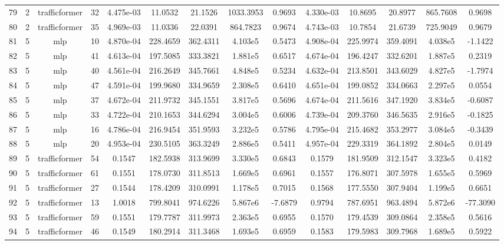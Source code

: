 \begin{landscape}
\begin{longtable}{c | c | c | c | c | c | c | c | c | c | c | c | c | c}
	79 & 2 & trafficformer & 32 & 4.475e-03 & 11.0532 & 21.1526 & 1033.3953 & 0.9693 & 4.330e-03 & 10.8695 & 20.8977 & 865.7608 & 0.9698 \\
	80 & 2 & trafficformer & 35 & 4.969e-03 & 11.0336 & 22.0391 & 864.7823 & 0.9674 & 4.743e-03 & 10.7854 & 21.6739 & 725.9049 & 0.9679 \\
	81 & 5 & mlp & 10 & 4.870e-04 & 228.4659 & 362.4311 & 4.103e5 & 0.5473 & 4.908e-04 & 225.9974 & 359.4091 & 4.038e5 & -1.1422 \\
	82 & 5 & mlp & 41 & 4.613e-04 & 197.5085 & 333.3821 & 1.881e5 & 0.6517 & 4.674e-04 & 196.4247 & 332.6201 & 1.887e5 & 0.2319 \\
	83 & 5 & mlp & 40 & 4.561e-04 & 216.2649 & 345.7661 & 4.848e5 & 0.5234 & 4.632e-04 & 213.8501 & 343.6029 & 4.827e5 & -1.7974 \\
	84 & 5 & mlp & 47 & 4.591e-04 & 199.9680 & 334.9659 & 2.308e5 & 0.6410 & 4.651e-04 & 199.0852 & 334.0663 & 2.297e5 & 0.0554 \\
	85 & 5 & mlp & 37 & 4.672e-04 & 211.9732 & 345.1551 & 3.817e5 & 0.5696 & 4.674e-04 & 211.5616 & 347.1920 & 3.834e5 & -0.6087 \\
	86 & 5 & mlp & 33 & 4.722e-04 & 210.1653 & 344.6294 & 3.004e5 & 0.6006 & 4.739e-04 & 209.3760 & 346.5635 & 2.916e5 & -0.1825 \\
	87 & 5 & mlp & 16 & 4.786e-04 & 216.9454 & 351.9593 & 3.232e5 & 0.5786 & 4.795e-04 & 215.4682 & 353.2977 & 3.084e5 & -0.3439 \\
	88 & 5 & mlp & 20 & 4.953e-04 & 230.5105 & 363.3249 & 2.886e5 & 0.5411 & 4.957e-04 & 229.3319 & 364.1892 & 2.804e5 & 0.0149 \\
	89 & 5 & trafficformer & 54 & 0.1547 & 182.5938 & 313.9699 & 3.330e5 & 0.6843 & 0.1579 & 181.9509 & 312.1547 & 3.323e5 & 0.4182 \\
	90 & 5 & trafficformer & 61 & 0.1551 & 178.0730 & 311.8513 & 1.669e5 & 0.6961 & 0.1557 & 176.8071 & 307.5978 & 1.655e5 & 0.5969 \\
	91 & 5 & trafficformer & 27 & 0.1544 & 178.4209 & 310.0991 & 1.178e5 & 0.7015 & 0.1568 & 177.5550 & 307.9404 & 1.199e5 & 0.6651 \\
	92 & 5 & trafficformer & 13 & 1.0018 & 799.8041 & 974.6226 & 5.867e6 & -7.6879 & 0.9794 & 787.6951 & 963.4894 & 5.872e6 & -77.3090 \\
	93 & 5 & trafficformer & 59 & 0.1551 & 179.7787 & 311.9973 & 2.363e5 & 0.6955 & 0.1570 & 179.4539 & 309.0864 & 2.358e5 & 0.5616 \\
	94 & 5 & trafficformer & 46 & 0.1549 & 180.2914 & 311.3468 & 1.693e5 & 0.6959 & 0.1583 & 179.5983 & 309.7968 & 1.689e5 & 0.5922 \\

\end{longtable}
\end{landscape}
